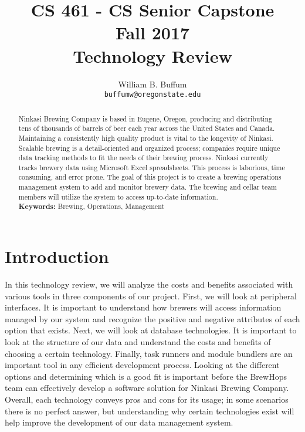 \documentclass[draftclsnofoot,onecolumn,letterpaper,10pt,compsoc]{IEEEtran}
\title{CS 461 - CS Senior Capstone
	\\Fall 2017
	\\Technology Review
}
\author{
	William B. Buffum \\
	\texttt{buffumw@oregonstate.edu}
}
\begin{document}
\begin{titlingpage}
    \maketitle
    \begin{abstract}
      Ninkasi Brewing Company is based in Eugene, Oregon, producing and distributing tens of thousands of barrels of beer each year across the United States and Canada.
      Maintaining a consistently high quality product is vital to the longevity of Ninkasi.
      Scalable brewing is a detail-oriented and organized process; companies require unique data tracking methods to fit the needs of their brewing process.
      Ninkasi currently tracks brewery data using Microsoft Excel spreadsheets.
      This process is laborious, time consuming, and error prone.
      The goal of this project is to create a brewing operations management system to add and monitor brewery data.
      The brewing and cellar team members will utilize the system to access up-to-date information.
      \\
      \textbf{Keywords:} Brewing, Operations, Management
    \end{abstract}
		\pagebreak
        \tableofcontents
\end{titlingpage}

\section{Introduction}
In this technology review, we will analyze the costs and benefits associated with various tools in three components of our project. 
First, we will look at peripheral interfaces. 
It is important to understand how brewers will access information managed by our system and recognize the positive and negative attributes of each option that exists. 
Next, we will look at database technologies. 
It is important to look at the structure of our data and understand the costs and benefits of choosing a certain technology. 
Finally, task runners and module bundlers are an important tool in any efficient development process. 
Looking at the different options and determining which is a good fit is important before the BrewHops team can effectively develop a software solution for Ninkasi Brewing Company. 
Overall, each technology conveys pros and cons for its usage; in some scenarios there is no perfect answer, but understanding why certain technologies exist will help improve the development of our data management system.
\end{document}
